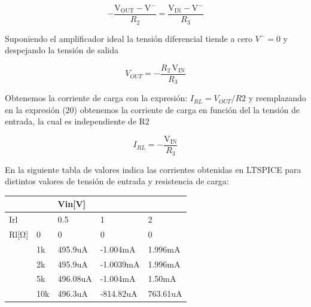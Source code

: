 \documentclass[12pt]{article}
\begin{document}
		\begin{equation}
			-\frac{\mathrm{V_{OUT}}-\mathrm{V^-}}{R_2 }=\frac{\mathrm{V_{IN}}-\mathrm{V^-}}{R_3 }
		\end{equation}
		
		Suponiendo el amplificador ideal la tensión diferencial tiende a cero ${V^-}=0$ y despejando 
		la tensión de salida
		
		\begin{equation}
			{V_{OUT}}=-\frac{R_2 \,\mathrm{V_{IN}}}{R_3 }
		\end{equation}
		
		Obtenemos la corriente de carga con la expresión: $I_{RL}=V_{OUT}/R2$ y reemplazando en la expresión
		(20) obtenemos la corriente de carga en función del la tensión de entrada, la cual es independiente
		de R2
		
		\begin{equation}
			{I_{RL}}=-\frac{\mathrm{V_{IN}}}{R_3 }
		\end{equation} 
		
		En la siguiente tabla de valores indica las corrientes obtenidas en LTSPICE para distintos
		valores de tensión de entrada y resistencia de carga:
		\begin{table}[!ht]
			\centering
			\begin{tabular}{|l|l|l|l|l|}
				\hline
				~ & ~ & Vin[V] & ~ & ~ \\ \hline
				Irl & ~ & 0.5 & 1 & 2 \\ \hline
				Rl[Ω] & 0 & 0 & 0 & 0 \\ \hline
				~ & 1k & 495.9uA & -1.004mA & 1.996mA \\ \hline
				~ & 2k & 495.9uA & -1.0039mA & 1.996mA \\ \hline
				~ & 5k & 496.08uA & -1.004mA & 1.50mA \\ \hline
				~ & 10k & 496.3uA & -814.82uA & 763.61uA \\ \hline
			\end{tabular}
		\end{table}
		
		
		
\end{document}
